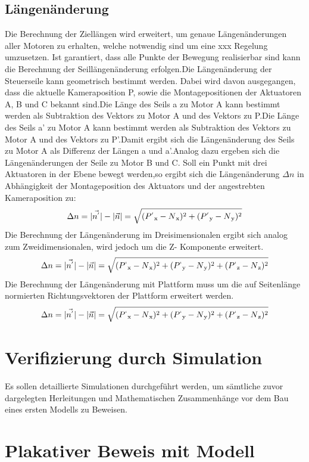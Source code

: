 \documentclass[a4paper, 12pt]{article}
\begin{document}
		\subsection{Längenänderung}
			Die Berechnung der Ziellängen wird erweitert, um genaue Längenänderungen aller Motoren zu erhalten, welche notwendig sind um eine xxx Regelung umzusetzen.
			Ist garantiert, dass alle Punkte der Bewegung realisierbar sind kann die Berechnung der Seillängenänderung erfolgen.Die Längenänderung der Steuerseile kann geometrisch bestimmt werden.
			Dabei wird davon ausgegangen, dass die aktuelle Kameraposition P, sowie die Montagepositionen der Aktuatoren A, B und C bekannt sind.Die Länge des Seils a zu Motor A kann bestimmt werden als Subtraktion des Vektors zu Motor A und des Vektors zu P.Die Länge des Seils a' zu Motor A kann bestimmt werden als Subtraktion des Vektors zu Motor A und des Vektors zu P'.Damit ergibt sich die Längenänderung des Seils zu Motor A als Differenz der Längen a und a'.Analog dazu ergeben sich die Längenänderungen der Seile zu Motor B und C.
			Soll ein Punkt mit drei Aktuatoren in der Ebene bewegt werden,so ergibt sich die Längenänderung $\Delta n$ in Abhängigkeit der Montageposition des Aktuators und der angestrebten Kameraposition zu:
			\begin{align}
				\Delta n =
				|\vec{n^{'}}|-|\vec{n}|=
				\sqrt	{
						(P^{'}\textsubscript{x}-N\textsubscript{x})^2+
						(P^{'}\textsubscript{y}-N\textsubscript{y})^2
						}
			\end{align}
			Die Berechnung der Längenänderung im Dreisimensionalen ergibt sich analog zum Zweidimensionalen, wird jedoch um die Z- Komponente erweitert.
			\begin{align}
				\Delta n =
				|\vec{n^{'}}|-|\vec{n}|=
				\sqrt	{
						(P^{`}\textsubscript{x}-N\textsubscript{x})^2+
						(P^{`}\textsubscript{y}-N\textsubscript{y})^2+
						(P^{`}\textsubscript{z}-N\textsubscript{z})^2
						}
			\end{align}	
			Die Berechnung der Längenänderung mit Plattform muss um die auf Seitenlänge normierten Richtungsvektoren der Plattform erweitert werden.
			\begin{align}
				\Delta n =
				|\vec{n^{'}}|-|\vec{n}|=
				\sqrt	{
						(P^{`}\textsubscript{x}-N\textsubscript{x})^2+
						(P^{`}\textsubscript{y}-N\textsubscript{y})^2+
						(P^{`}\textsubscript{z}-N\textsubscript{z})^2
						}
			\end{align}
			\pagebreak
	\section{Verifizierung durch Simulation}
	Es sollen detaillierte Simulationen durchgeführt werden, um sämtliche zuvor dargelegten Herleitungen und Mathematischen Zusammenhänge vor dem Bau eines ersten Modells zu Beweisen.
	\section{Plakativer Beweis mit Modell}
\end{document}
